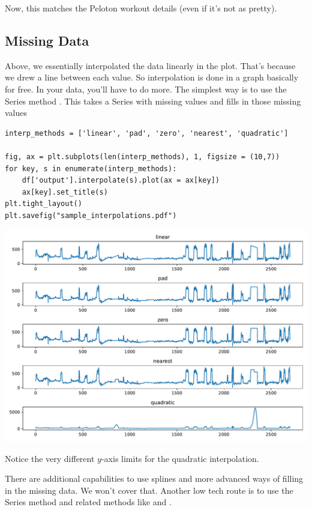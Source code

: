 Now, this matches the Peloton workout details (even if it's not as pretty). 

\subsection{Missing Data}

Above, we essentially interpolated the data linearly in the plot. That's because we drew a line between each value. So interpolation is done in a graph basically for free. In your data, you'll have to do more. The simplest way is to use the Series method . This takes a Series with missing values and fills in those missing values


\begin{lstlisting}
interp_methods = ['linear', 'pad', 'zero', 'nearest', 'quadratic']

fig, ax = plt.subplots(len(interp_methods), 1, figsize = (10,7))
for key, s in enumerate(interp_methods):
    df['output'].interpolate(s).plot(ax = ax[key])
    ax[key].set_title(s)
plt.tight_layout()
plt.savefig("sample_interpolations.pdf")
\end{lstlisting}


\begin{center}
    \includegraphics[width = .9\textwidth]{images/sample_interpolations.pdf}
\end{center}

\noindent Notice the very different $y$-axis limits for the quadratic interpolation. 

There are additional capabilities to use splines and more advanced ways of filling in the missing data. We won't cover that. Another low tech route is to use the  Series method and related methods like  and .



